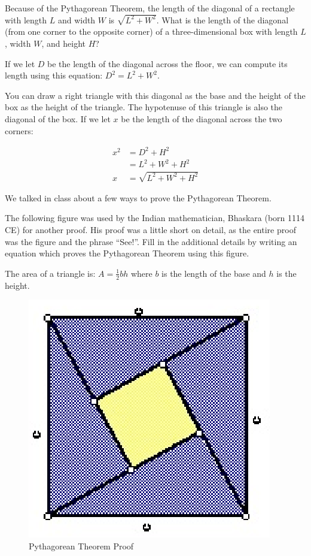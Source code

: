 \documentclass[fleqn,addpoints]{exam}
\begin{document}
\begin{questions}

\question 

Because of the Pythagorean Theorem, the length of the diagonal of a rectangle with length $L$ and width $W$
is \( \sqrt{L^2 + W^2} \).  What is the length of the diagonal (from one corner to the opposite corner) of a
three-dimensional box with length $L$, width $W$, and height $H$?

\begin{solution}
If we let $D$ be the length of the diagonal across the floor, we can compute its length using this equation: \(D^2 = L^2 + W^2 \).  

You can draw a right triangle with this diagonal as the base and the height of the box as the height of the triangle.
The hypotenuse of this triangle is also the diagonal of the box.  If we let $x$ be the length of the diagonal across
the two corners:

\begin{align*}
  x^2 &= D^2 + H^2 \\
      &= L^2 + W^2 + H^2 \\
  x   &= \sqrt{L^2 + W^2 + H^2}
\end{align*}

\end{solution}

\question
We talked in class about a few ways to prove the Pythagorean Theorem.  

The following figure was used by the Indian mathematician, Bhaskara (born 1114 CE) for another proof.  His proof was a
little short on detail, as the entire proof was the figure and the phrase ``See!''.  Fill in the additional details by
writing an equation which proves the Pythagorean Theorem using this figure. 

The area of a triangle is: \( A = \frac{1}{2}bh \) where $b$ is the length of the base and $h$ is the height.

\ifprintanswers
\else
\begin{figure}[h]
  \centering
  \includegraphics*{proof.eps}  
  \caption{Pythagorean Theorem Proof}
  \label{fig:proof}
\end{figure}
\fi


\end{questions}
\end{document}
